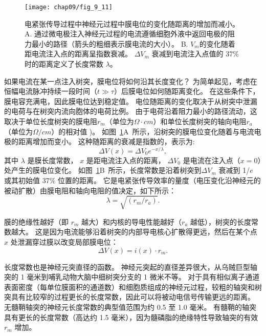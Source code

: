 \begin{figure}[htbp]
	\centering
	\texttt{[image: chap09/fig\_9\_11]}
	\caption{电紧张传导过程中神经元过程中膜电位的变化随距离的增加而减小。
		A. 通过微电极注入神经元过程的电流遵循细胞外液中返回电极的阻力最小的路径（箭头的粗细表示膜电流的大小）。
		B. $V_m$的变化随着距电流注入点的距离呈指数衰减。
		$\Delta V_m$ 衰减到电流注入点值的 37\% 时的距离定义了长度常数 $\lambda$。}
	\label{fig:9_11}
\end{figure}

如果电流在某一点注入树突，膜电位将如何沿其长度变化？
为简单起见，考虑在恒幅电流脉冲持续一段时间（$t \gg \tau$）后膜电位如何随距离变化。
在这些条件下，膜电容充满电，因此膜电位达到稳定值。
电位随距离的变化取决于从树突中泄漏的电荷与在树突内流向胞体的电荷比例。
由于电荷沿着阻力最小的路径流动，这取决于单位长度树突的膜电阻$r_m$（单位为$\Omega \cdot cm$）和单位长度树突的轴向电阻$r_a$（单位为$\Omega/cm$）的相对值 )。
如图~\ref{fig:9_11}A~所示，沿树突的膜电位变化随着与电流电极的距离增加而变小。
这种随距离的衰减是指数的，表示为:
\begin{equation}
	\Delta V(x) = 
		\Delta V_0 e^{-x/\lambda},
\end{equation}
其中 $\lambda$ 是膜长度常数，
$x$ 是距电流注入点的距离，
$\Delta V_0$ 是电流在注入点（$x = 0$）处产生的膜电位变化。
如图~\ref{fig:9_11}B~所示，长度常数是沿着树突到$\Delta V_m$ 衰减到 1/$e$ 或其初始值 37\% 位置的距离。
它是电紧张传导效率的量度（电压变化沿神经元的被动扩散）由膜电阻和轴向电阻的值决定，如下所示：
\begin{equation}
	\lambda = \sqrt{(r_m / r_a)}.
\end{equation}


膜的绝缘性越好（即 $r_m$ 越大）和内核的导电性能越好（$r_a$ 越低），树突的长度常数越大。
这是因为电流能够沿着树突的内部导电核心扩散得更远，然后在某个点 $x$ 处泄漏穿过膜以改变局部膜电位：
\begin{equation}
	\Delta V(x) = i(x) \cdot r_m.
\end{equation}


长度常数也是神经元突直径的函数。
神经元突起的直径差异很大，从乌贼巨型轴突的 1 毫米到哺乳动物大脑中细树突分支的 1 微米不等。
对于具有相似离子通道表面密度（每单位膜面积的通道数）和细胞质组成的神经元过程，较粗的轴突和树突具有比较窄的过程更长的长度常数，因此可以将被动电信号传输更远的距离。
无髓鞘轴突的神经元长度常数的典型值范围为约 0.5 至 1.0 毫米。
有髓鞘的轴突具有更长的长度常数（高达约 1.5 毫米），因为髓磷脂的绝缘特性导致轴突的有效 $r_m$ 增加。


